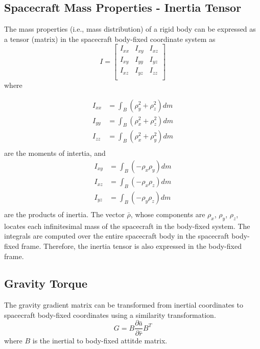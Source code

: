 \subsection{Spacecraft Mass Properties - Inertia Tensor}
The mass properties (i.e., mass distribution) of a rigid body can be expressed as 
a tensor (matrix) in the spacecraft body-fixed coordinate system as
\begin{equation}
I = 
\left[
\begin{array}{rrr}
 I_{xx} &  I_{xy} &  I_{xz} \\
 I_{xy} &  I_{yy} &  I_{yz} \\
 I_{xz} &  I_{yz} &  I_{zz} \\
\end{array}
\right]
\end{equation}
where

\begin{equation}
\begin{aligned}
I_{xx}  &= \int_B (\rho_y^2+\rho_z^2) dm\\
I_{yy}  &= \int_B (\rho_x^2+\rho_z^2) dm\\
I_{zz}  &= \int_B (\rho_x^2+\rho_y^2) dm\\
\end{aligned}
\end{equation}
are the moments of intertia, and
\begin{equation}
\begin{aligned}
I_{xy}  &= \int_B (-\rho_x\rho_y) dm\\
I_{xz}  &= \int_B (-\rho_x\rho_z) dm\\
I_{yz}  &= \int_B (-\rho_y\rho_z) dm\\
\end{aligned}
\end{equation}
are the products of inertia\cite{kaplan1976}. The vector $\bar{\rho}$, whose
components are $\rho_x$, $\rho_y$, $\rho_z$, locates each infinitesimal mass
of the spacecraft 
in the body-fixed system. The integrals are computed
over the entire spacecraft body in the spacecraft 
body-fixed frame. Therefore, the inertia tensor is
also expressed in the body-fixed frame.


\subsection{Gravity Torque}
The gravity gradient matrix can be transformed from inertial 
coordinates to spacecraft body-fixed coordinates using a similarity transformation\cite{SJ}.
\begin{equation}\label{eqn:G}
G = B\frac{\partial\bar{a}}{\partial\bar{r}} B^T
\end{equation}
where $B$ is the inertial to body-fixed attitde matrix.

